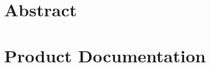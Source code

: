 \documentclass[11pt, oneside, a4paper]{book}
\begin{document}
\pagestyle{empty}

\frontmatter


\tableofcontents


% 

\mainmatter


\part{Abstract}


\part{Product Documentation}







% 
% 
% 



\end{document}
